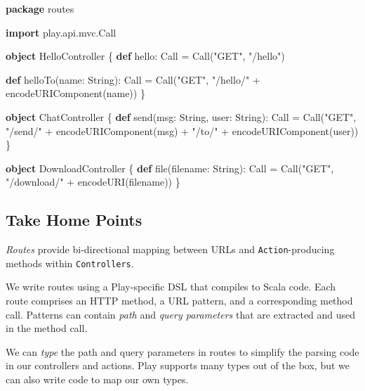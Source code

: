 \documentclass[oneside,11pt,a4paper,]{book}
\newenvironment{Shaded}{\begin{snugshade}}{\end{snugshade}}
\newcommand{\KeywordTok}[1]{\textcolor[rgb]{0.13,0.29,0.53}{\textbf{{#1}}}}
\newcommand{\StringTok}[1]{\textcolor[rgb]{0.31,0.60,0.02}{{#1}}}
\newcommand{\FunctionTok}[1]{\textcolor[rgb]{0.00,0.00,0.00}{{#1}}}
\newcommand{\NormalTok}[1]{{#1}}
\begin{document}
\begin{Shaded}
\begin{Highlighting}[]
\KeywordTok{package} \NormalTok{routes}

\KeywordTok{import} \NormalTok{play.}\FunctionTok{api}\NormalTok{.}\FunctionTok{mvc}\NormalTok{.}\FunctionTok{Call}

\KeywordTok{object} \NormalTok{HelloController \{}
  \KeywordTok{def} \NormalTok{hello: Call =}
    \FunctionTok{Call}\NormalTok{(}\StringTok{"GET"}\NormalTok{, }\StringTok{"/hello"}\NormalTok{)}

  \KeywordTok{def} \FunctionTok{helloTo}\NormalTok{(name: String): Call =}
    \FunctionTok{Call}\NormalTok{(}\StringTok{"GET"}\NormalTok{, }\StringTok{"/hello/"} \NormalTok{+ }\FunctionTok{encodeURIComponent}\NormalTok{(name))}
\NormalTok{\}}

\KeywordTok{object} \NormalTok{ChatController \{}
  \KeywordTok{def} \FunctionTok{send}\NormalTok{(msg: String, user: String): Call =}
    \FunctionTok{Call}\NormalTok{(}\StringTok{"GET"}\NormalTok{,}
      \StringTok{"/send/"} \NormalTok{+ }\FunctionTok{encodeURIComponent}\NormalTok{(msg) +}
      \StringTok{"/to/"} \NormalTok{+ }\FunctionTok{encodeURIComponent}\NormalTok{(user))}
\NormalTok{\}}

\KeywordTok{object} \NormalTok{DownloadController \{}
  \KeywordTok{def} \FunctionTok{file}\NormalTok{(filename: String): Call =}
    \FunctionTok{Call}\NormalTok{(}\StringTok{"GET"}\NormalTok{, }\StringTok{"/download/"} \NormalTok{+ }\FunctionTok{encodeURI}\NormalTok{(filename))}
\NormalTok{\}}
\end{Highlighting}
\end{Shaded}

\subsection{Take Home Points}\label{take-home-points-1}

\emph{Routes} provide bi-directional mapping between URLs and
\texttt{Action}-producing methods within \texttt{Controllers}.

We write routes using a Play-specific DSL that compiles to Scala code.
Each route comprises an HTTP method, a URL pattern, and a corresponding
method call. Patterns can contain \emph{path} and \emph{query
parameters} that are extracted and used in the method call.

We can \emph{type} the path and query parameters in routes to simplify
the parsing code in our controllers and actions. Play supports many
types out of the box, but we can also write code to map our own types.
\end{document}
